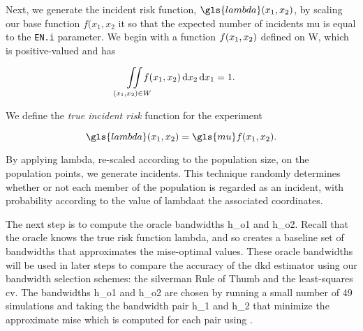 Next, we generate the incident risk function, $\gls{lambda}\xvec$, by scaling our base function $f(x_1, x_2$ it so that the expected number of incidents \gls{mu} is equal to the \texttt{EN.i} parameter.
We begin with a function $f(x_1, x_2)$ defined on \gls{W}, which is positive-valued and has 

\begin{equation}
    \iintW{f\xvec} = 1 \text{.}
\end{equation}

We define the \textit{true incident risk} function for the experiment

\begin{equation}
    \gls{lambda}\xvec = \gls{mu} f\xvec \text{.}
\end{equation}

By applying \gls{lambda}, re-scaled  according to the population size,
on the population points, we generate incidents.
This technique randomly determines whether or not each member of the population is regarded as an incident, with probability according to the value of \gls{lambda}\xvec at the associated coordinates.

The next step is to compute the \glspl{oracle bandwidth} \gls{h_o1} and \gls{h_o2}.
Recall that the \gls{oracle} knows the true risk function \gls{lambda},
and so creates a baseline set of bandwidths that approximates the \gls{mise}-optimal values.
These \glspl{oracle bandwidth} will be used in later steps to compare the accuracy of the \gls{dkd} estimator using our bandwidth selection schemes: the \Gls{silverman} Rule of Thumb and the least-squares \gls{cv}.
The bandwidths \gls{h_o1} and \gls{h_o2} are chosen by running a small number of 49 simulations and taking the bandwidth pair \gls{h_1} and \gls{h_2} that minimize the approximate \gls{mise} which is computed for each pair using .

